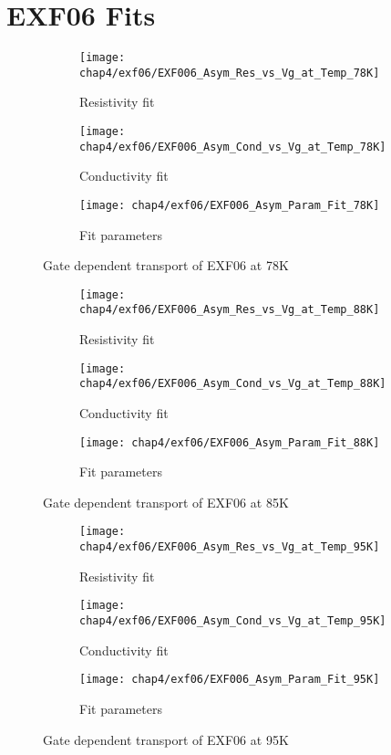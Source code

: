 \documentclass[../Matt_Gebert_Honours_Thesis.tex]{subfiles}
\begin{document}
	\section{EXF06 Fits}
	\begin{figure}[H]
		\centering
		\begin{subfigure}{0.4\textwidth}
			\centering
			\texttt{[image: chap4/exf06/EXF006\_Asym\_Res\_vs\_Vg\_at\_Temp\_78K]}
			\caption{Resistivity fit}
		\end{subfigure}
		\begin{subfigure}{0.4\textwidth}
			\centering
			\texttt{[image: chap4/exf06/EXF006\_Asym\_Cond\_vs\_Vg\_at\_Temp\_78K]}
			\caption{Conductivity fit}
		\end{subfigure}
		\begin{subfigure}{0.16\textwidth}
			\centering
			\texttt{[image: chap4/exf06/EXF006\_Asym\_Param\_Fit\_78K]}
			\caption{Fit parameters}
		\end{subfigure}
		\caption*{Gate dependent transport of EXF06 at 78K}
	\end{figure}
	\begin{figure}[H]
		\centering
		\begin{subfigure}{0.4\textwidth}
			\centering
			\texttt{[image: chap4/exf06/EXF006\_Asym\_Res\_vs\_Vg\_at\_Temp\_88K]}
			\caption{Resistivity fit}
		\end{subfigure}
		\begin{subfigure}{0.4\textwidth}
			\centering
			\texttt{[image: chap4/exf06/EXF006\_Asym\_Cond\_vs\_Vg\_at\_Temp\_88K]}
			\caption{Conductivity fit}
		\end{subfigure}
		\begin{subfigure}{0.16\textwidth}
			\centering
			\texttt{[image: chap4/exf06/EXF006\_Asym\_Param\_Fit\_88K]}
			\caption{Fit parameters}
		\end{subfigure}
		\caption*{Gate dependent transport of EXF06 at 85K}
	\end{figure}
	\begin{figure}[H]
		\centering
		\begin{subfigure}{0.4\textwidth}
			\centering
			\texttt{[image: chap4/exf06/EXF006\_Asym\_Res\_vs\_Vg\_at\_Temp\_95K]}
			\caption{Resistivity fit}
		\end{subfigure}
		\begin{subfigure}{0.4\textwidth}
			\centering
			\texttt{[image: chap4/exf06/EXF006\_Asym\_Cond\_vs\_Vg\_at\_Temp\_95K]}
			\caption{Conductivity fit}
		\end{subfigure}
		\begin{subfigure}{0.16\textwidth}
			\centering
			\texttt{[image: chap4/exf06/EXF006\_Asym\_Param\_Fit\_95K]}
			\caption{Fit parameters}
		\end{subfigure}
		\caption*{Gate dependent transport of EXF06 at 95K}
	\end{figure}
\end{document}
